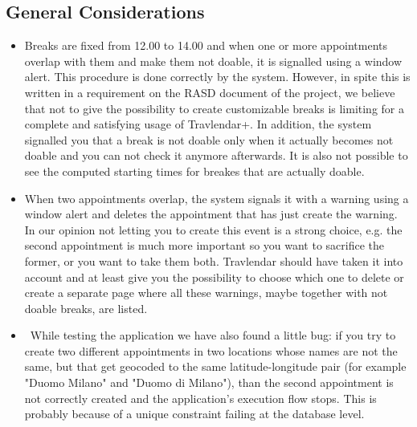 \subsection{General Considerations}
\begin{itemize}
	\item Breaks are fixed from 12.00 to 14.00 and when one or more appointments overlap with them and make them not doable, it is signalled using a window alert. This procedure is done correctly by the system. However, in spite this is written in a requirement on the RASD document of the project, we believe that not to give the possibility to create customizable breaks is limiting for a complete and satisfying usage of Travlendar+. In addition, the system signalled you that a break is not doable only when it actually becomes not doable and you can not check it anymore afterwards. It is also not possible to see the computed starting times for breakes that are actually doable.
	\item When two appointments overlap, the system signals it with a warning using a window alert and deletes the appointment that has just create the warning. In our opinion not letting you to create this event is a strong choice, e.g. the second appointment is much more important so you want to sacrifice the former, or you want to take them both. Travlendar should have taken it into account and at least give you the possibility to choose which one to delete or create a separate page where all these warnings, maybe together with not doable breaks, are listed.
	\item~While testing the application we have also found a little bug: if you try to create two different appointments in two locations whose names are not the same, but that get geocoded to the same latitude-longitude pair (for example "Duomo Milano" and "Duomo di Milano"), than the second appointment is not correctly created and the application's execution flow stops. This is probably because of a unique constraint failing at the database level.
\end{itemize}